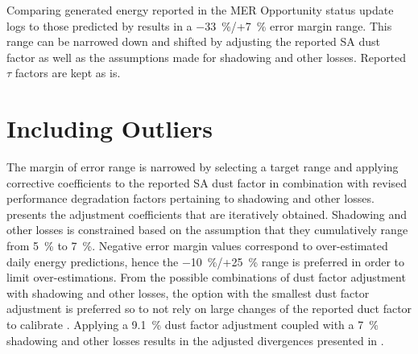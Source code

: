 Comparing generated energy reported in the \ac{MER} Opportunity status update logs to those predicted by  results in a \SI{-33}{\percent}/+\SI{7}{\percent} error margin range. This range can be narrowed down and shifted by adjusting the reported \ac{SA} dust factor as well as the assumptions made for shadowing and other losses. Reported $\tau$ factors are kept as is.

\section{Including Outliers}
\label{sec:Appendix:NarrowedEnergyPredictionErrorMarginRange:PreservingOutliers}

The margin of error range is narrowed by selecting a target range and applying corrective coefficients to the reported \ac{SA} dust factor in combination with revised performance degradation factors pertaining to shadowing and other losses.  presents the adjustment coefficients that are iteratively obtained. Shadowing and other losses is constrained based on the assumption that they cumulatively range from \SI{5}{\percent} to \SI{7}{\percent}. Negative error margin values correspond to over-estimated daily energy predictions, hence the \SI{-10}{\percent}/+\SI{25}{\percent} range is preferred in order to limit over-estimations. From the possible combinations of dust factor adjustment with shadowing and other losses, the option with the smallest dust factor adjustment is preferred so to not rely on large changes of the reported duct factor to calibrate . Applying a \SI{9.1}{\percent} dust factor adjustment coupled with a \SI{7}{\percent} shadowing and other losses results in the adjusted divergences presented in .

